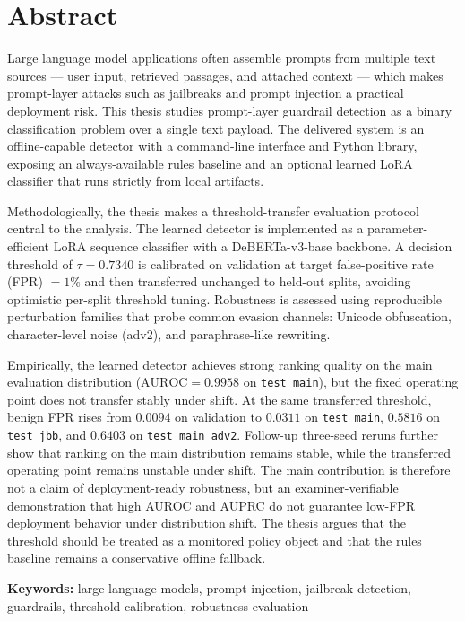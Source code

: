 \chapter*{Abstract}

Large language model applications often assemble prompts from multiple text sources --- user input, retrieved passages, and attached context --- which makes prompt-layer attacks such as jailbreaks and prompt injection a practical deployment risk. This thesis studies prompt-layer guardrail detection as a binary classification problem over a single text payload. The delivered system is an offline-capable detector with a command-line interface and Python library, exposing an always-available rules baseline and an optional learned LoRA classifier that runs strictly from local artifacts.

Methodologically, the thesis makes a threshold-transfer evaluation protocol central to the analysis. The learned detector is implemented as a parameter-efficient LoRA sequence classifier with a DeBERTa-v3-base backbone. A decision threshold of \(\tau = 0.7340\) is calibrated on validation at target false-positive rate (FPR) \(= 1\%\) and then transferred unchanged to held-out splits, avoiding optimistic per-split threshold tuning. Robustness is assessed using reproducible perturbation families that probe common evasion channels: Unicode obfuscation, character-level noise (adv2), and paraphrase-like rewriting.

Empirically, the learned detector achieves strong ranking quality on the main evaluation distribution (\(\mathrm{AUROC}=0.9958\) on \texttt{test\_main}), but the fixed operating point does not transfer stably under shift. At the same transferred threshold, benign FPR rises from \(0.0094\) on validation to \(0.0311\) on \texttt{test\_main}, \(0.5816\) on \texttt{test\_jbb}, and \(0.6403\) on \texttt{test\_main\_adv2}. Follow-up three-seed reruns further show that ranking on the main distribution remains stable, while the transferred operating point remains unstable under shift. The main contribution is therefore not a claim of deployment-ready robustness, but an examiner-verifiable demonstration that high AUROC and AUPRC do not guarantee low-FPR deployment behavior under distribution shift. The thesis argues that the threshold should be treated as a monitored policy object and that the rules baseline remains a conservative offline fallback.

\noindent\textbf{Keywords:} large language models, prompt injection, jailbreak detection, guardrails, threshold calibration, robustness evaluation
